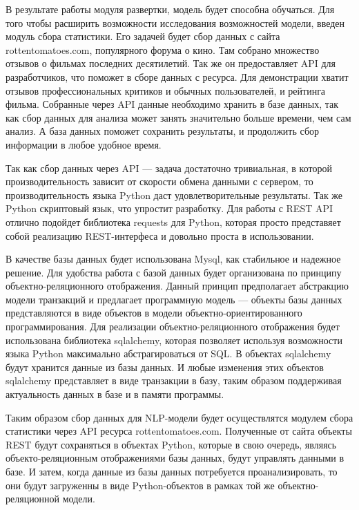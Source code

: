 В результате работы модуля развертки, модель будет способна обучаться. Для того чтобы расширить возможности исследования возможностей модели, введен модуль сбора статистики. Его задачей будет сбор данных с сайта rottentomatoes.com, популярного форума о кино. Там собрано множество отзывов о фильмах последних десятилетий. Так же он предоставляет API для разработчиков, что поможет в сборе данных с ресурса. Для демонстрации хватит отзывов профессиональных критиков и обычных пользователей, и рейтинга фильма. Собранные через API данные необходимо хранить в базе данных, так как сбор данных для анализа может занять значительно больше времени, чем сам анализ. А база данных поможет сохранить результаты, и продолжить сбор информации в любое удобное время.

Так как сбор данных через API --- задача достаточно тривиальная, в которой производительность зависит от скорости обмена данными с сервером, то производительность языка Python даст удовлетворительные результаты. Так же Python скриптовый язык, что упростит разработку. Для работы с REST API отлично подойдет библиотека requests для Python, которая просто представяет собой реализацию REST-интерфеса и довольно проста в использовании.

В качестве базы данных будет использована Mysql, как стабильное и надежное решение. Для удобства работа с базой данных будет организована по принципу объектно-реляционного отображения. Данный принцип предполагает абстракцию модели транзакций и предлагает программную модель --- объекты базы данных представляются в виде объектов в модели объектно-ориентированного программирования. Для реализации объектно-реляционного отображения будет использована библиотека sqlalchemy, которая позволяет используя возможности языка Python максимально абстрагироваться от SQL\@. В объектах sqlalchemy будут хранится данные из базы данных. И любые изменения этих объектов sqlalchemy представляет в виде транзакции в базу, таким образом поддерживая актуальность данных в базе и в памяти программы.

Таким образом сбор данных для NLP-модели будет осуществлятся модулем сбора статистики через API ресурса rottentomatoes.com. Полученные от сайта объекты REST будут сохраняться в объектах Python, которые в свою очередь, являясь объекто-реляционным отображениями базы данных, будут управлять данными в базе. И затем, когда данные из базы данных потребуется проанализировать, то они будут загруженны в виде Python-объектов в рамках той же объектно-реляционной модели.

